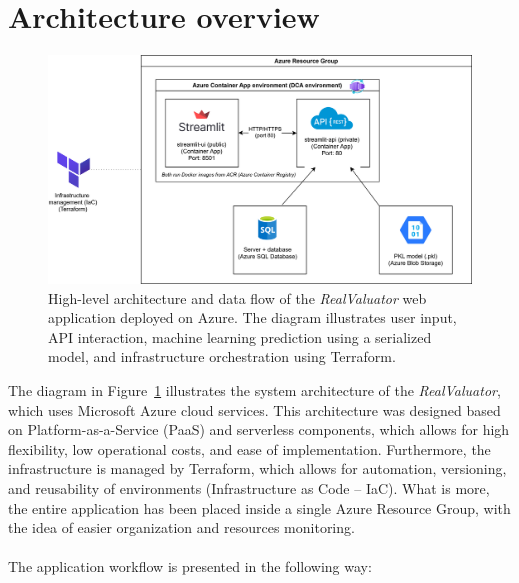 \documentclass{article}
\begin{document}
\section{Architecture overview}

    \begin{figure}[h!]
    \centering
    \includegraphics[width=12cm,keepaspectratio]{architecture.png}
    \caption{High-level architecture and data flow of the \textit{RealValuator} web application deployed on Azure. The diagram illustrates user input, API interaction, machine learning prediction using a serialized model, and infrastructure orchestration using Terraform.}
    \label{fig:arch}
\end{figure}


The diagram in Figure~\ref{fig:arch} illustrates the system architecture of the \textit{RealValuator}, which uses Microsoft Azure cloud services. This architecture was designed based on Platform-as-a-Service (PaaS) and serverless components, which allows for high flexibility, low operational costs, and ease of implementation. Furthermore, the infrastructure is managed by Terraform, which allows for automation, versioning, and reusability of environments (Infrastructure as Code – IaC). What is more, the entire application has been placed inside a single Azure Resource Group, with the idea of easier organization and resources monitoring.

\paragraph{}
The application workflow is presented in the following way:
\end{document}
